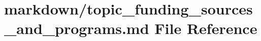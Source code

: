\hypertarget{topic__funding__sources__and__programs_8md}{}\section{markdown/topic\+\_\+funding\+\_\+sources\+\_\+and\+\_\+programs.md File Reference}
\label{topic__funding__sources__and__programs_8md}
